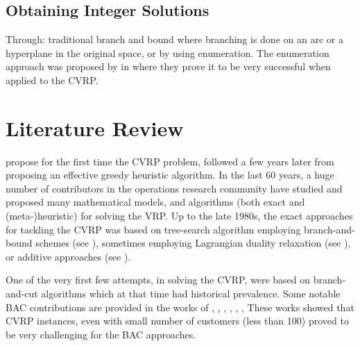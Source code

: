 \subsection{Obtaining Integer Solutions}

Through: traditional branch and bound where branching is done on an arc or a hyperplane in the original space, or by using enumeration.
The enumeration approach was proposed by \textcite{baldacci2008} in where they prove it to be very successful when applied to the CVRP.


\begin{comment}
\cite{jepsen2011}
The other method is enumeration which has proven to be very successful
for both cvrp[1] and vrptw[3]. In enumeration an upper bound U B and
a lower bound LB are used. From reduced cost fixing of a binary variable
it is know that any non basic column with a reduced cost strictly greater
than the gap ub − lb can not be part of an integer solution which is an
improvement of the current solution. This complete set of columns can be
found by solving an espprc using the dominance rule in proposition 5 and
bounding functions. Once we have added the columns with reduced cost less
than or equal to the gap the resulting problem can be solved as an integer
optimization problem.
\end{comment}

\section{Literature Review}
\label{sec:intro-literature-review}



\textcite{dantzig1959} propose for the first time the CVRP problem,
followed a few years later from \textcite{clarke1964} proposing
an effective greedy heuristic algorithm.
In the last 60 years, a huge number of contributors in
the operations research community have studied and proposed many
mathematical models, and algorithms (both exact and (meta-)heuristic)
for solving the VRP.
Up to the late 1980s, the exact approaches for tackling the CVRP was
based on tree-search algorithm employing branch-and-bound schemes
(see \textcite{christofides1969a, christofides1981, laporte1986}),
sometimes employing Lagrangian duality relaxation (see \textcite{fisher1994a, miller1995}),
or additive approaches (see \textcite{fischetti1994a, hadjiconstantinou1995}).

One of the very first few attempts, in solving the CVRP, were based on branch-and-cut algorithms
which at that time had historical prevalence.
Some notable BAC contributions are provided in the works of
\textcite{araqueg1994}, \textcite{augerat1995}, \textcite{blasum2000}, \textcite{achuthan2003}, \textcite{ralphs2003}, \textcite{lysgaard2004},
These works showed that CVRP instances, even with small number of customers (less than 100) proved
to be very challenging for the BAC approaches.

